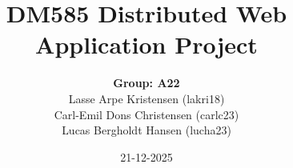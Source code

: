\usepackage[utf8]{inputenc}
	\usepackage[utf8]{inputenc}
	\usepackage[T1]{fontenc}
	\usepackage{amsmath, amsfonts, amssymb, amsthm}
	\usepackage[left=2cm, right=2cm, top=3cm, bottom=3cm]{geometry} 
	\usepackage{graphicx}

\usepackage{fancyhdr}
	\pagestyle{fancy}
	\setlength{\headheight}{15pt}

\usepackage{rotating}
\usepackage{float}

	\author{\textbf{Group: A22} \\
    Lasse Arpe Kristensen (lakri18)\\
    Carl-Emil Dons Christensen (carlc23)\\
    Lucas Bergholdt Hansen (lucha23)
    }
	\title{ \vspace*{-2em} DM585 Distributed Web Application Project}
  
	\date{21-12-2025}
    
	\setlength{\parindent}{0.0em}
	\setlength{\parskip}{1em}
	\linespread{1.1}
\usepackage{comment}

\usepackage{wrapfig}

\usepackage{times}
\usepackage{titlesec}
	\titlespacing{\paragraph}{0pt}{2pt}{6pt}


